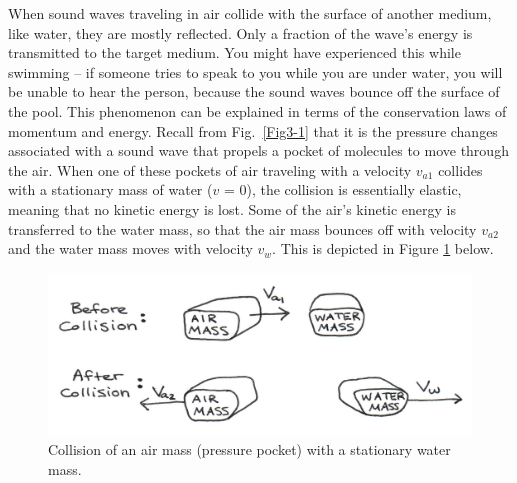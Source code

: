 When sound waves traveling in air collide with the surface of another medium, like water, they are mostly reflected.  Only a fraction of the wave’s energy is transmitted to the target medium.  You might have experienced this while swimming -- if someone tries to speak to you while you are under water, you will be unable to hear the person, because the sound waves bounce off the surface of the pool.  This phenomenon can be explained in terms of the conservation laws of momentum and energy.  Recall from Fig.~\ref{Fig3-1} that it is the pressure changes associated with a sound wave that propels a pocket of molecules to move through the air.  When one of these pockets of air traveling with a velocity $v_{a1}$ collides with a stationary mass of water ($v$ = 0), the collision is essentially elastic, meaning that no kinetic energy is lost.  Some of the air’s kinetic energy is transferred to the water mass, so that the air mass bounces off with velocity $v_{a2}$ and the water mass moves with velocity $v_{w}$.  This is depicted in Figure \ref{Fig3-5} below.
\begin{figure}[htb]
	\centering
	\includegraphics[width=5.0in]{./figures/Topic3/Fig3-5.jpg}
	\caption{Collision of an air mass (pressure pocket) with a stationary water mass.}
 	\label{Fig3-5}
\end{figure}
 
